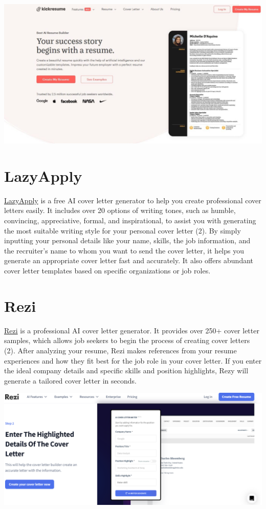 \documentclass[
]{book}
\begin{document}
\includegraphics[width=5.46875in,height=\textheight]{Kickresume pic.png}

\hypertarget{lazyapply}{%
\section{LazyApply}\label{lazyapply}}

\href{https://lazyapply.com/cover-letter-generator}{LazyApply} is a free AI cover letter generator to help you create professional cover letters easily. It includes over 20 options of writing tones, such as humble, convincing, appreciative, formal, and inspirational, to assist you with generating the most suitable writing style for your personal cover letter (2). By simply inputting your personal details like your name, skills, the job information, and the recruiter's name to whom you want to send the cover letter, it helps you generate an appropriate cover letter fast and accurately. It also offers abundant cover letter templates based on specific organizations or job roles.

\hypertarget{rezi}{%
\section{Rezi}\label{rezi}}

\href{https://www.rezi.ai/}{Rezi} is a professional AI cover letter generator. It provides over 250+ cover letter samples, which allows job seekers to begin the process of creating cover letters (2). After analyzing your resume, Rezi makes references from your resume experiences and how they fit best for the job role in your cover letter. If you enter the ideal company details and specific skills and position highlights, Rezy will generate a tailored cover letter in seconds.~

\includegraphics[width=5.5in,height=\textheight]{Rezi pic.png}
\end{document}

